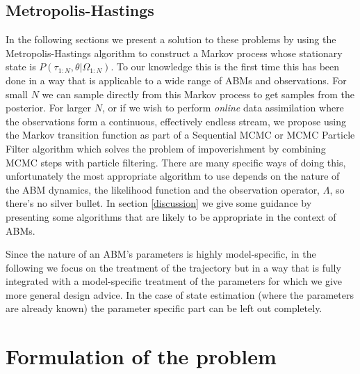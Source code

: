 \documentclass{article}
\begin{document}
\subsection{Metropolis-Hastings}
In the following sections we present a solution to these problems by using the Metropolis-Hastings algorithm to construct a Markov process whose stationary state is $P(\tau_{1:N},\theta|\Omega_{1:N})$. To our knowledge this is the first time this has been done in a way that is applicable to a wide range of ABMs and observations. For small $N$ we can sample directly from this Markov process to get samples from the posterior. For larger $N$, or if we wish to perform \textit{online} data assimilation where the observations form a continuous, effectively endless stream, we propose using the Markov transition function as part of a Sequential MCMC or MCMC Particle Filter algorithm \citep*{finke2020limit, septier2009mcmc} which solves the problem of impoverishment by combining MCMC steps with particle filtering. There are many specific ways of doing this, unfortunately the most appropriate algorithm to use depends on the nature of the ABM dynamics, the likelihood function and the observation operator, $\Lambda$, so there's no silver bullet. In section \ref{discussion} we give some guidance by presenting some algorithms that are likely to be appropriate in the context of ABMs.

Since the nature of an ABM's parameters is highly model-specific, in the following we focus on the treatment of the trajectory but in a way that is fully integrated with a model-specific treatment of the parameters for which we give more general design advice. In the case of state estimation (where the parameters are already known) the parameter specific part can be left out completely.

\section{Formulation of the problem}
\end{document}
